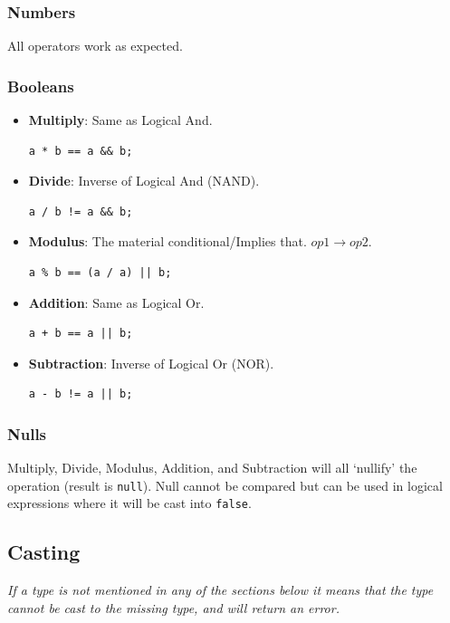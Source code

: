 \documentclass[]{full}
\theoremstyle{definition}
\begin{document}
\subsubsection{Numbers}

All operators work as expected.

\subsubsection{Booleans}

\begin{itemize}
    \item \textbf{Multiply}: Same as Logical And.
    \begin{verbatim}
a * b == a && b;
    \end{verbatim}
    \item \textbf{Divide}: Inverse of Logical And (NAND).
    \begin{verbatim}
a / b != a && b;
    \end{verbatim}
    \item \textbf{Modulus}: The material conditional/Implies that. $op1 \rightarrow op2$.
    \begin{verbatim}
a % b == (a / a) || b;
    \end{verbatim}
    \item \textbf{Addition}: Same as Logical Or.
    \begin{verbatim}
a + b == a || b;
    \end{verbatim}
    \item \textbf{Subtraction}: Inverse of Logical Or (NOR).
    \begin{verbatim}
a - b != a || b;
    \end{verbatim}
\end{itemize}

\subsubsection{Nulls}

Multiply, Divide, Modulus, Addition, and Subtraction will all `nullify' the operation (result is \verb|null|). Null cannot be compared but can be used in logical expressions where it will be cast into \verb|false|.

\subsection{Casting}

\begin{center}
\textit{If a type is not mentioned in any of the sections below it means that the type cannot be cast to the missing type, and will return an error.}
\end{center}
\end{document}
